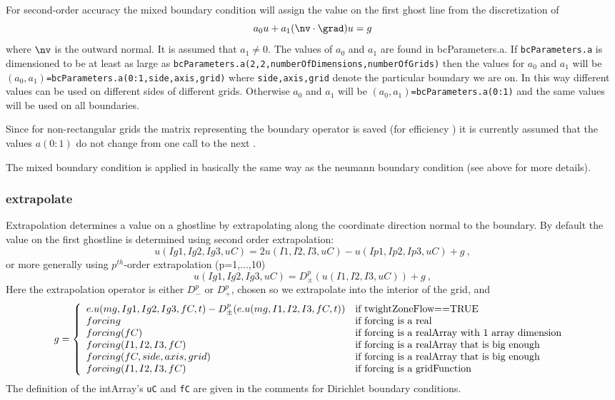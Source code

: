 For second-order accuracy the mixed boundary condition will assign the
value on the first ghost line from the discretization of
\[
a_0 u + a_1 (\nv\cdot\grad) u = g
\]
where $\nv$ is the outward normal. It is assumed that $a_1\ne 0$.
The values of $a_0$ and $a_1$ are
found in {\ff bcParameters.a}. If {\tt bcParameters.a}
is dimensioned to be at least as large as {\tt bcParameters.a(2,2,numberOfDimensions,numberOfGrids)}
then the values for $a_0$ and $a_1$ will be {\tt $(a_0,a_1)$=bcParameters.a(0:1,side,axis,grid)} where 
{\tt side,axis,grid} denote the particular boundary we are on. In this way different values can be 
used on different sides of different grids.
Otherwise $a_0$ and $a_1$ will be {\tt $(a_0,a_1)$=bcParameters.a(0:1)} and the same values will
be used on all boundaries.

Since 
for non-rectangular grids
the
matrix representing the boundary operator is saved (for efficiency )
it is currently assumed that the
values $a(0:1)$ do not change from one call to the next .

The mixed boundary condition is applied in basically the same way as the
{\ff neumann} boundary condition (see above for more details).

\subsubsection{extrapolate}

Extrapolation determines a value on a ghostline by extrapolating along the
coordinate direction normal to the boundary. By default the value on the
first ghostline is determined using second order extrapolation:
\[
u(Ig1,Ig2,Ig3,uC) = 2 u(I1,I2,I3,uC) - u(Ip1,Ip2,Ip3,uC) + g ~,
\]
or more generally using $p^{th}$-order extrapolation (p=1,...,10)
\[
u(Ig1,Ig2,Ig3,uC) = D_{\pm}^p(u(I1,I2,I3,uC)) + g ~,
\]
Here the extrapolation operator is either $D_-^p$ or $D_+^p$, chosen so we extrapolate into the
interior of the grid, and
\[
g= \left\{ \begin{array}{ll}
        e. u(mg,Ig1,Ig2,Ig3,fC,t) - D_{\pm}^p(e. u(mg,I1,I2,I3,fC,t)) & \mbox{if twightZoneFlow==TRUE} \\
    forcing              & \mbox{if forcing is a real      } \\
    forcing(fC)           & \mbox{if forcing  is a realArray with 1 array dimension } \\
    forcing(I1,I2,I3,fC)  & \mbox{if forcing is a realArray that is big enough} \\
    forcing(fC,side,axis,grid) & \mbox{if forcing is a realArray that is big enough} \\
    forcing(I1,I2,I3,fC)  & \mbox{if forcing is a gridFunction} \\
          \end{array}
  \right.
\]
The definition of the intArray's {\tt uC} and {\tt fC} are given in the comments for Dirichlet boundary conditions.

